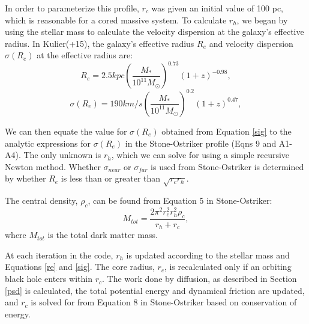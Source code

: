 \documentclass[english, apj]{emulateapj}
\begin{document}
In order to parameterize this profile, $r_c$ was given an initial value of 100 pc, which is reasonable for a cored massive system.  To calculate $r_h$, we began by using the stellar mass to calculate the velocity dispersion at the galaxy's effective radius.  In Kulier(+15), the galaxy's effective radius $R_{e}$ and velocity dispersion $\sigma(R_e)$ at the effective radius are:
\begin{equation} \label{re}
R_{e} = 2.5 kpc\left(\frac{M_*}{10^{11}M_{\odot}}\right)^{0.73}(1+z)^{-0.98},
\end{equation}
\begin{equation} \label{sig}
\sigma(R_{e}) = 190km/s\left(\frac{M_{*}}{10^{11}M_{\odot}}\right)^{0.2}(1+z)^{0.47},
\end{equation}

We can then equate the value for $\sigma({R_e})$ obtained from Equation \ref{sig} to the analytic expressions for $\sigma(R_{e})$ in the Stone-Ostriker profile (Eqns 9 and A1-A4).  The only unknown is $r_h$, which we can solve for using a simple recursive Newton method.  Whether $\sigma_{near}$ or $\sigma_{far}$ is used from Stone-Ostriker is determined by whether $R_e$ is less than or greater than $\sqrt{r_c r_h}$.

The central density, $\rho_c$, can be found from Equation 5 in Stone-Ostriker:
\begin{equation} \label{rhoc}
M_{tot} = \frac{2\pi^2r_{c}^2r_{h}^2\rho_c}{r_h+r_c},
\end{equation}
where $M_{tot}$ is the total dark matter mass.

At each iteration in the code, $r_h$ is updated according to the stellar mass and Equations \ref{re} and \ref{sig}.  The core radius, $r_c$, is recalculated only if an orbiting black hole enters within $r_c$.  The work done by diffusion, as described in Section \ref{psd} is calculated, the total potential energy and dynamical friction are updated, and $r_c$ is solved for from Equation 8 in Stone-Ostriker based on conservation of energy.
\end{document}
